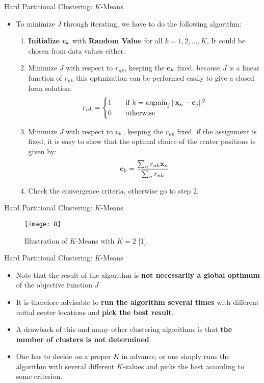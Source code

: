 \documentclass[compress,oilve]{beamer}
\DeclareMathOperator*{\argmin}{argmin}
\begin{document}
\begin{frame}{Hard Partitional Clustering: $K$-Means}
\begin{itemize}
\item To minimize $ J $ through iterating, we have to do the following algorithm:
	\begin{enumerate}
		\item \textbf{Initialize} $ \mathbf{c_{\mathnormal k}} $ with \textbf{Random Value} for all $ k = 1, 2, \dots, K$, It could be chosen from data values either.
		\item Minimize $ J $ with respect to $ r_{nk} $, keeping the $ \mathbf{c_{\mathnormal k}} $ fixed. because $ J $ is a linear function of $ r_{nk} $ this optmization can be performed easily to give a closed form solution:
				$$ r_{nk} = \begin{cases}
    1      & \quad \text{if } k =  \argmin_{j} \| \mathbf{x_{\mathnormal n}} -  \mathbf{c_{\mathnormal j}} \| ^ {2}\\
   0  & \quad \text{otherwise}
  \end{cases} $$
		\item Minimize $ J $ with respect to $ \mathbf{c_{\mathnormal k}} $, keeping the $ r_{nk} $ fixed. if the assignment is fixed, it is easy to show that the optimal choice of the center positions is given by:
			$$ \mathbf{c_{\mathnormal k}} =  \frac{\sum_{n} r_{nk}\mathbf x_{\mathnormal n}}{\sum_{n} r_{nk}}$$
		\item Check the convergence criteria, otherwise go to step 2.	
	\end{enumerate}
\end{itemize}
\end{frame}

\begin{frame}{Hard Partitional Clustering: $K$-Means}
\begin{figure}
	\centering
	\texttt{[image: 8]}
	\caption{Illustration of $K$-Means with $K = 2$ [1].}
\end{figure}
\end{frame}

\begin{frame}{Hard Partitional Clustering: $K$-Means}
\begin{itemize}
\item Note that the result of the algorithm is \textbf{not necessarily a global optimum} of the objective function $ J $
\item It is therefore advisable to \textbf{run the algorithm several times} with different initial center locations and \textbf{pick the best result}.
\item A drawback of this and many other clustering algorithms is that \textbf{the number of clusters is not determined}.
\item One has to decide on a proper $K$ in advance, or one simply runs the algorithm with several different $K$-values and picks the best according to some criterion.
\end{itemize}
\end{frame}
\end{document}
